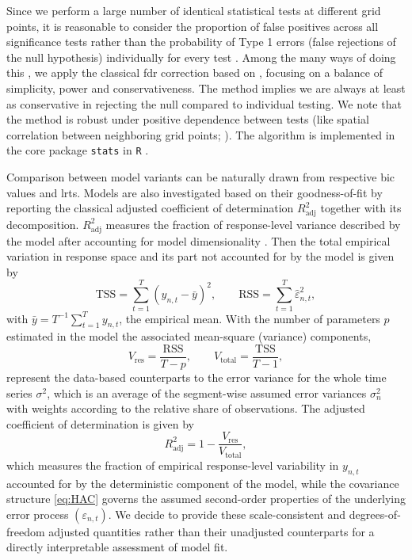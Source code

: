 Since we perform a large number of identical statistical tests at different grid points, it is reasonable to consider the proportion of false positives across all significance tests rather than the probability of Type 1 errors (false rejections of the null hypothesis) individually for every test \parencite[ch.~5]{StatisticalMethodsAtmospheric2019}. Among the many ways of doing this \parencite{dickhausSimultaneousStatisticalInference2014, benjaminiDiscoveringFalseDiscovery2010}, we apply the classical \gls{fdr} correction based on \textcite{benjaminiControllingFalseDiscovery1995}, focusing on a balance of simplicity, power and conservativeness. The method implies we are always at least as  conservative in rejecting the null compared to individual testing. We note that the method is robust under positive dependence between tests (like spatial correlation between neighboring grid points; \cite{benjaminiControlFalseDiscovery2001}). The algorithm is implemented in the core package \texttt{stats} in \texttt{R} \parencite{rcoreteamLanguageEnvironmentStatistical2022}.

Comparison between model variants can be naturally drawn from respective \gls{bic} values and \glspl{lrt}. Models are also investigated based on their goodness-of-fit by reporting the classical adjusted coefficient of determination $R^2_{\text{adj}}$ together with its decomposition. $R^2_{\text{adj}}$ measures the fraction of response-level variance described by the model after accounting for model dimensionality \parencite{hittnerEzekielsClassicEstimator2020}.
Then the total empirical variation in response space and its part not accounted for by the model is given by
\begin{equation}
    \mathrm{TSS} = \sum_{t=1}^T (y_{n,t}-\bar y)^2,\qquad
    \mathrm{RSS} = \sum_{t=1}^T \hat{\varepsilon}_{n,t}^2,
\end{equation}
with $\bar y = T^{-1}\sum_{t=1}^T y_{n,t}$, the empirical mean. With the number of parameters $p$ estimated in the model the associated mean-square (variance) components,
\begin{equation}
    V_{\mathrm{res}}
    =
    \frac{\mathrm{RSS}}{T-p},
    \qquad
    V_{\mathrm{total}}
    =
    \frac{\mathrm{TSS}}{T-1},
\end{equation}
represent the data-based counterparts to the error variance for the whole time series $\sigma^2$, which is an average of the segment-wise assumed error variances $\sigma^2_n$ with weights according to the relative share of observations. The adjusted coefficient of determination is given by
\begin{equation}
    R^2_{\mathrm{adj}}
    =
    1-
    \frac{V_{\mathrm{res}}}
    {V_{\mathrm{total}}},
\end{equation}
which measures the fraction of empirical response-level variability in $y_{n,t}$ accounted for by the deterministic component of the model, while the covariance structure \eqref{eq:HAC} governs the assumed second-order properties of the underlying error process $(\varepsilon_{n,t})$. We decide to provide these scale-consistent and degrees-of-freedom adjusted quantities rather than their unadjusted counterparts for a directly interpretable assessment of model fit.

